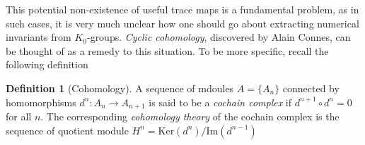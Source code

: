 \documentclass[aps,pra,showpacs,notitlepage,onecolumn,superscriptaddress,nofootinbib]{revtex4-1}
\theoremstyle{definition}
\newtheorem{definition}{Definition}[section]
\begin{document}
\noindent This potential non-existence of useful trace maps is a fundamental problem, as in such cases, it is very much unclear how one should go about extracting numerical invariants from $K_0$-groups.
\emph{Cyclic cohomology}, discovered by Alain Connes, can be thought of as a remedy to this situation. To be more specific, recall the following definition

\begin{definition}[Cohomology]
  A sequence of mdoules $A = \{A_n\}$ connected by homomorphisms $d^n : A_n \rightarrow A_{n + 1}$ is said to be a \emph{cochain complex} if $d^{n + 1} \circ d^{n} = 0$ for all $n$.
  The corresponding \emph{cohomology theory} of the cochain complex is the sequence of quotient module $H^{n} = \text{Ker}(d^{n}) / \text{Im}(d^{n - 1})$
  \end{definition}
\end{document}
